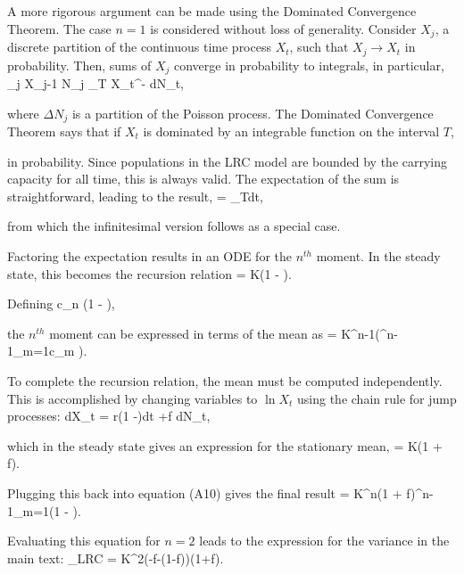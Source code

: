 A more rigorous argument can be made using the Dominated Convergence Theorem.  The case $n=1$ is considered without loss of generality.  Consider $X_j$, a discrete partition of the continuous time process $X_t$, such that $X_j \to X_t$ in probability.  Then, sums of $X_j$ converge in probability to integrals, in particular,
\be
\sum_j X_{j-1} \Delta N_j \to \int_T X_{t^-} dN_t,
\ee

\noindent where $\Delta N_j$ is a partition of the Poisson process.  The Dominated Convergence Theorem says that if $X_t$ is dominated by an integrable function on the interval $T$,
\be
\expec{} \to \expec{}
\ee

\noindent in probability.  Since populations in the LRC model are bounded by the carrying capacity for all time, this is always valid.  The expectation of the sum is straightforward, leading to the result,
\be
\expec{} = \int_T\expec[X_{t^-}]\lambda dt,
\ee

\noindent from which the infinitesimal version follows as a special case.

Factoring the expectation results in an ODE for the $n^{th}$ moment.  In the steady state, this becomes the recursion relation
\be
\expec[X^{n+1}] = K\left(1 - \right)\expec[X^{n}].
\ee

\noindent Defining 
\be
c_n \equiv \left(1 - \right),
\ee

\noindent the $n^{th}$ moment can be expressed in terms of the mean as
\be
\expec[X^n] = K^{n-1}\left(\prod^{n-1}_{m=1}c_m \right)\expec[X].
\ee

To complete the recursion relation, the mean must be computed independently.  This is accomplished by changing variables to $\ln X_t$ using the chain rule for jump processes:
\be
d\ln X_t = r\left(1 -\right)dt +\ln f dN_t,
\ee

\noindent which in the steady state gives an expression for the stationary mean,
\be
\expec[X] = K\left(1 + \ln f\right).
\ee

\noindent Plugging this back into equation (A10) gives the final result
\be
\expec[X^n] = K^{n}\left(1 + \ln f\right)\prod^{n-1}_{m=1}\left(1 - \right).
\ee

\noindent Evaluating this equation for $n=2$ leads to the expression for the variance in the main text:
\be
 \Var[X]_{LRC} = K^2\left(-\ln f-(1-f)\right)\left(1+\ln f\right).
\ee

